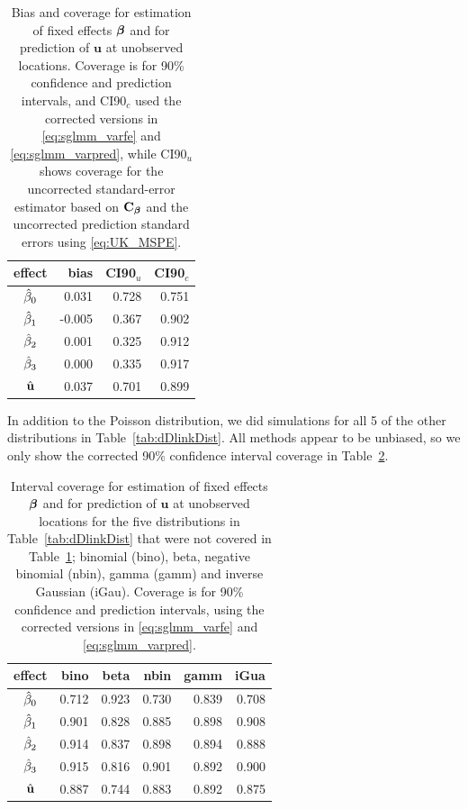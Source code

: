 \documentclass[12pt, titlepage]{article}
\begin{document}
\begin{table}[H] 
	\caption{Bias and coverage for estimation of fixed effects $\boldsymbol{\beta}$ and for prediction of $\mathbf{u}$ at unobserved locations.  Coverage is for 90\% confidence and prediction intervals, and CI90$_{c}$ used the corrected versions in \eqref{eq:sglmm_varfe} and \eqref{eq:sglmm_varpred}, while CI90$_{u}$ shows coverage for the uncorrected standard-error estimator based on $\mathbf{C}_{\boldsymbol{\beta}}$ and the uncorrected prediction standard errors using \eqref{eq:UK_MSPE}.  \label{tab:sglm_fe}}
\begin{center}
\begin{tabular}{|c|rrr|}
\hline
\hline
effect & bias & CI90$_{u}$ & CI90$_{c}$ \\
\hline{}
${\hat{\beta}}_{0}$ & 0.031 & 0.728 & 0.751 \\ 
${\hat{\beta}}_{1}$ & -0.005 & 0.367 & 0.902 \\ 
${\hat{\beta}}_{2}$ & 0.001 & 0.325 & 0.912 \\ 
${\hat{\beta}}_{3}$ & 0.000 & 0.335 & 0.917 \\ 
$\hat{\mathbf{u}}$ & 0.037 & 0.701 & 0.899 \\  
\hline
\hline
\end{tabular}
\end{center}
\end{table}

In addition to the Poisson distribution, we did simulations for all 5 of the other distributions in Table~\ref{tab:dDlinkDist}.  All methods appear to be unbiased, so we only show the corrected 90\% confidence interval coverage in Table~\ref{tab:simCI90_all}.

\begin{table}[H] 
	\caption{Interval coverage for estimation of fixed effects $\boldsymbol{\beta}$ and for prediction of $\mathbf{u}$ at unobserved locations for the five distributions in Table~\ref{tab:dDlinkDist} that were not covered in Table~\ref{tab:sglm_fe}; binomial (bino), beta, negative binomial (nbin), gamma (gamm) and inverse Gaussian (iGau).  Coverage is for 90\% confidence and prediction intervals, using the corrected versions in \eqref{eq:sglmm_varfe} and \eqref{eq:sglmm_varpred}.  \label{tab:simCI90_all}}
\begin{center}
\begin{tabular}{|c|rrrrr|}
\hline
\hline
effect & bino & beta & nbin & gamm & iGua \\
\hline{}
${\hat{\beta}}_{0}$ & 0.712 & 0.923 & 0.730 & 0.839 & 0.708 \\ 
${\hat{\beta}}_{1}$ & 0.901 & 0.828 & 0.885 & 0.898 & 0.908 \\ 
${\hat{\beta}}_{2}$ & 0.914 & 0.837 & 0.898 & 0.894 & 0.888 \\ 
${\hat{\beta}}_{3}$ & 0.915 & 0.816 & 0.901 & 0.892 & 0.900 \\ 
$\hat{\mathbf{u}}$ & 0.887 & 0.744 & 0.883 & 0.892 & 0.875 \\  
\hline
\hline
\end{tabular}
\end{center}
\end{table}
\end{document}
